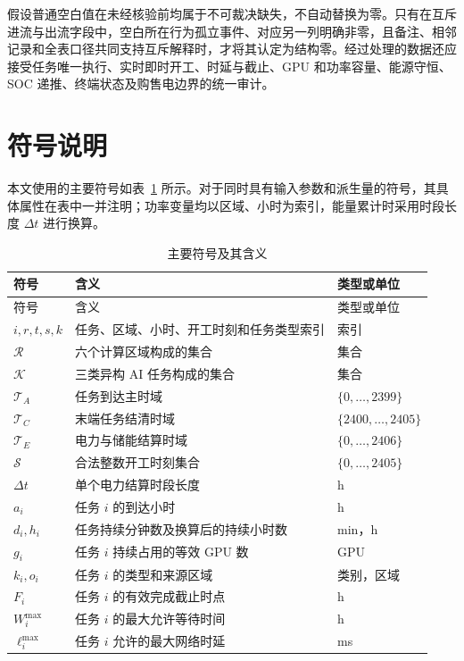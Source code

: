 \documentclass[withoutpreface,bwprint]{cumcmthesis}
\begin{document}
假设普通空白值在未经核验前均属于不可裁决缺失，不自动替换为零。只有在互斥进流与出流字段中，空白所在行为孤立事件、对应另一列明确非零，且备注、相邻记录和全表口径共同支持互斥解释时，才将其认定为结构零。经过处理的数据还应接受任务唯一执行、实时即时开工、时延与截止、GPU 和功率容量、能源守恒、SOC 递推、终端状态及购售电边界的统一审计。

\section{符号说明}

本文使用的主要符号如表~\ref{tab:symbols} 所示。对于同时具有输入参数和派生量的符号，其具体属性在表中一并注明；功率变量均以区域、小时为索引，能量累计时采用时段长度 $\Delta t$ 进行换算。

{\scriptsize
\renewcommand{\arraystretch}{0.88}
\setlength{\tabcolsep}{3pt}
\begin{longtable}{lll}
\caption{主要符号及其含义}
\label{tab:symbols}\\
\toprule
符号 & 含义 & 类型或单位 \\
\midrule
\endfirsthead
\toprule
符号 & 含义 & 类型或单位 \\
\midrule
\endhead
\bottomrule
\endfoot
$i,r,t,s,k$ & 任务、区域、小时、开工时刻和任务类型索引 & 索引 \\
$\mathcal R$ & 六个计算区域构成的集合 & 集合 \\
$\mathcal K$ & 三类异构 AI 任务构成的集合 & 集合 \\
$\mathcal T_A$ & 任务到达主时域 & $\{0,\ldots,2399\}$ \\
$\mathcal T_C$ & 末端任务结清时域 & $\{2400,\ldots,2405\}$ \\
$\mathcal T_E$ & 电力与储能结算时域 & $\{0,\ldots,2406\}$ \\
$\mathcal S$ & 合法整数开工时刻集合 & $\{0,\ldots,2405\}$ \\
$\Delta t$ & 单个电力结算时段长度 & h \\
$a_i$ & 任务 $i$ 的到达小时 & h \\
$d_i,h_i$ & 任务持续分钟数及换算后的持续小时数 & min，h \\
$g_i$ & 任务 $i$ 持续占用的等效 GPU 数 & GPU \\
$k_i,o_i$ & 任务 $i$ 的类型和来源区域 & 类别，区域 \\
$F_i$ & 任务 $i$ 的有效完成截止时点 & h \\
$W_i^{\max}$ & 任务 $i$ 的最大允许等待时间 & h \\
$\ell_i^{\max}$ & 任务 $i$ 允许的最大网络时延 & ms \\

\end{longtable}}
\end{document}
